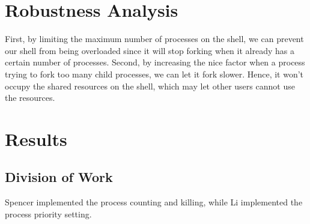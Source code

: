 \documentclass{article}
\begin{document}

\section{Robustness Analysis}

First, by limiting the maximum number of processes on the shell, we can prevent our shell from being overloaded since it will stop forking when it already has a certain number of processes.
Second, by increasing the nice factor when a process trying to fork too many child processes, we can let it fork slower.  Hence, it won’t occupy the shared resources on the shell, which may let other users cannot use the resources. \\ 





\section{Results}


\subsection{Division of Work}
Spencer implemented the process counting and killing, while Li implemented the
process priority setting.
\end{document}

